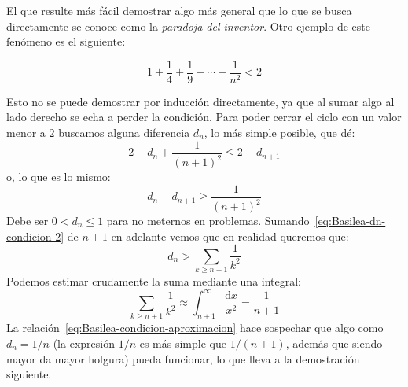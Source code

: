   El que resulte más fácil demostrar algo más general
  que lo que se busca directamente
  se conoce como la \emph{paradoja del inventor}.%
  Otro ejemplo de este fenómeno es el siguiente:%
  \begin{theorem}
    \label{theo:Basilea-converge}
    \begin{equation*}
      1 + \frac{1}{4} + \frac{1}{9} + \dotsb + \frac{1}{n^2}
	< 2
    \end{equation*}
  \end{theorem}
  Esto no se puede demostrar por inducción directamente,
  ya que al sumar algo al lado derecho
  se echa a perder la condición.
  Para poder cerrar el ciclo con un valor menor a \(2\)
  buscamos alguna diferencia \(d_n\),
  lo más simple posible,
  que dé:
  \begin{equation}
    \label{eq:Basilea-dn-condicion}
    2 - d_n + \frac{1}{(n + 1)^2}
     \le 2 - d_{n + 1}
  \end{equation}
  o,
  lo que es lo mismo:
  \begin{equation}
    \label{eq:Basilea-dn-condicion-2}
    d_n - d_{n + 1}
      \ge \frac{1}{(n + 1)^2}
  \end{equation}
  Debe ser \(0 < d_n \le 1\) para no meternos en problemas.
  Sumando~\eqref{eq:Basilea-dn-condicion-2}
  de \(n + 1\) en adelante
  vemos que en realidad queremos que:
  \begin{equation}
    \label{eq:Basilea-dn-condicion-3}
    d_n
      > \sum_{k \ge n + 1} \frac{1}{k^2}
  \end{equation}
  Podemos estimar crudamente la suma mediante una integral:
  \begin{equation}
    \label{eq:Basilea-condicion-aproximacion}
    \sum_{k \ge n + 1} \frac{1}{k^2}
      \approx \int_{n + 1}^\infty \frac{\mathrm{d} x}{x^2}
      = \frac{1}{n + 1}
  \end{equation}
  La relación~\eqref{eq:Basilea-condicion-aproximacion}
  hace sospechar que algo como \(d_n = 1 / n\)
  (la expresión \(1 / n\) es más simple que \(1 / (n + 1)\),
   además que siendo mayor da mayor holgura)
  pueda funcionar,
  lo que lleva a la demostración siguiente.

